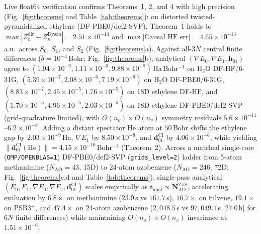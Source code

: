 \documentclass[10pt,twocolumn]{article}
\theoremstyle{natthm}
\newcommand{\dCI}{\mathbf{d}_{01}^{\mathrm{CI}}}
\newcommand{\hCI}{\mathbf{h}_{01}}
\begin{document}
Live float64 verification confirms Theorems~1, 2, and 4 with high precision (Fig.~\ref{fig:theorems} and Table~\ref{tab:theorems}):
on distorted twisted-pyramidalized ethylene (DF-PBE0/def2-SVP), Theorem~1 holds to $\max|Z_n^{\mathrm{dir}}-Z_n^{\mathrm{Dyson}}|=2.51\times 10^{-14}$ and $\max|\text{Causal HF err}|=4.65\times 10^{-13}$\,a.u.\ across $S_0$, $S_1$, and $S_2$ (Fig.~\ref{fig:theorems}a).
Against all-$3N$ central finite differences ($\delta=10^{-4}$\,Bohr; Fig.~\ref{fig:theorems}b), analytical $(\nabla E_0, \nabla E_1, \hCI)$ agree to $(1.94\times 10^{-9}, 1.11\times 10^{-6}, 9.88\times 10^{-8})$\,Ha\,Bohr$^{-1}$ on $\mathrm{H}_2\mathrm{O}$ DF-HF/6-31G, $(5.39\times 10^{-7}, 2.08\times 10^{-6}, 7.19\times 10^{-9})$ on $\mathrm{H}_2\mathrm{O}$ DF-PBE0/6-31G, $(8.83\times 10^{-7}, 2.45\times 10^{-5}, 1.76\times 10^{-5})$ on 18D ethylene DF-HF, and $(1.70\times 10^{-5}, 4.96\times 10^{-5}, 2.03\times 10^{-5})$ on 18D ethylene DF-PBE0/def2-SVP (grid-quadrature limited), with $O(n_o)\times O(n_v)$ symmetry residuals $5.6\times 10^{-11}$--$6.2\times 10^{-8}$.
Adding a distant spectator He atom at $50$\,Bohr shifts the ethylene gap by $2.03\times 10^{-9}$\,Ha, $\nabla E_1$ by $8.50\times 10^{-8}$, and $\dCI$ by $4.06\times 10^{-6}$, while yielding $\|\dCI(\mathrm{He})\|=4.15\times 10^{-10}$\,Bohr$^{-1}$ (Theorem~2).
Across a matched single-core (\texttt{OMP/OPENBLAS=1}) DF-PBE0/def2-SVP (\texttt{grids\_level=2}) ladder from 5-atom methanimine ($N_{\mathrm{AO}}=43$, 15D) to 24-atom azobenzene ($N_{\mathrm{AO}}=246$, 72D; Fig.~\ref{fig:theorems}c,d and Table~\ref{tab:theorems}), single-pass analytical $(E_0,E_1,\nabla E_0,\nabla E_1,\dCI)$ scales empirically as $\mathbf{t_{\mathrm{anal}}\propto N_{\mathrm{AO}}^{2.58}}$, accelerating evaluation by $\mathbf{6.8\times}$ on methanimine ($23.9$\,s vs $161.7$\,s), $16.7\times$ on fulvene, $19.1\times$ on PSB3$^+$, and $\mathbf{47.4\times}$ on 24-atom azobenzene ($2{,}048.5$\,s vs $97{,}049.1$\,s [$27.0$\,h] for $6N$ finite differences) while maintaining $O(n_o)\times O(n_v)$ invariance at $1.51\times 10^{-6}$.
\end{document}
